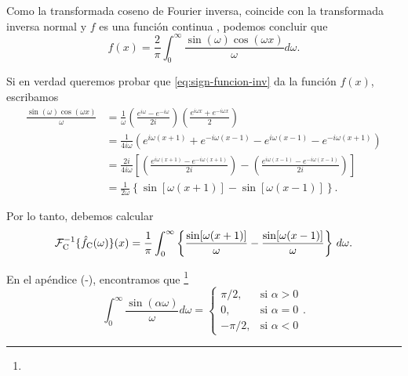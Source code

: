 \begin{ejemplo}
Como la transformada coseno de Fourier inversa, coincide con la transformada inversa normal y $f$ es una función continua , podemos concluir que
\begin{equation}
    f(x) = \frac{2}{\pi} \int_{0}^{\infty} \frac{\sin(\omega) \cos(\omega x)}{\omega} d\omega.
\end{equation}

Si en verdad queremos probar que \eqref{eq:sign-funcion-inv} da la función $f(x)$, escribamos
\begin{align}
    \frac{\sin(\omega)\cos(\omega x)}{\omega} &= \frac{1}{\omega} \left( \frac{e^{i\omega} - e^{-i\omega}}{2i}\right) \left( \frac{e^{i\omega x} + e^{-i\omega x}}{2}\right) \nonumber\\
    &= \frac{1}{4i\omega} \left(e^{i\omega(x + 1)} + e^{-i\omega(x-1)} - e^{i\omega(x-1)} - e^{-i\omega(x+1)} \right) \nonumber\\
    &= \frac{2i}{4i\omega} \left[ \left( \frac{e^{i\omega(x+1)} - e^{-i\omega(x+1)}}{2i}\right)  - \left( \frac{e^{i\omega(x-1)} - e^{-i\omega(x-1)}}{2i}\right)\right] \nonumber\\
    &= \frac{1}{2\omega} \left\{\sin[\omega(x+1)] - \sin[\omega(x-1)]\right\}.
\end{align}

Por lo tanto, debemos calcular
\begin{equation}
     \mathcal{F}^{-1}_{\rm C}\{\hat{f}_{\rm C}(\omega)\}(x) = \frac{1}{\pi} \int_{0}^{\infty} \left\{\frac{\sin[\omega(x+1)]}{\omega} - \frac{\sin[\omega(x-1)]}{\omega}\right\} \,d \omega. \label{eq:Inv-Sign}
\end{equation}

En el apéndice (-), encontramos que \footnote{}
\begin{equation}
    \int_{0}^{\infty} \frac{\sin(\alpha \omega)}{\omega} d\omega = \left\{ \begin{array}{cl}
        \pi/2, & \text{si $\alpha > 0$}  \\
        0, & \text{si $\alpha = 0$} \\
        -\pi/2, & \text{si $\alpha < 0$}
    \end{array} \right. .
\end{equation}


\end{ejemplo}
